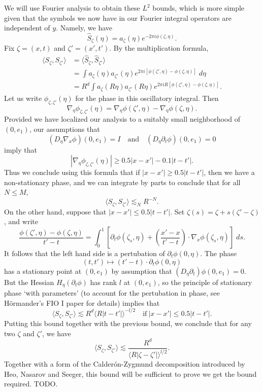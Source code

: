 We will use Fourier analysis to obtain these $L^2$ bounds, which is more simple given that the symbols we now have in our Fourier integral operators are independent of $y$. Namely, we have
%
\[ \widehat{S}_\zeta(\eta) = a_\zeta(\eta) e^{- 2 \pi i \phi(\zeta,\eta)}. \]
%
Fix $\zeta = (x,t)$ and $\zeta' = (x',t')$. By the multiplication formula,
%
\begin{align*}
    \langle S_\zeta, S_{\zeta'} \rangle &= \langle \widehat{S}_\zeta, \widehat{S}_{\zeta'} \rangle\\
    &= \int a_\zeta(\eta) a_{\zeta'}(\eta) e^{2 \pi i [ \phi(\zeta', \eta) - \phi(\zeta,\eta) ]}\; d\eta\\
    &= R^d \int a_\zeta( R \eta) a_{\zeta'}( R \eta ) e^{2 \pi i R [ \phi(\zeta', \eta) - \phi(\zeta, \eta) ] }.
\end{align*}
%
Let us write $\phi_{\zeta,\zeta'}(\eta)$ for the phase in this oscillatory integral. Then
%
\[ \nabla_\eta \phi_{\zeta,\zeta'}(\eta) = \nabla_\eta \phi(\zeta', \eta) - \nabla_\eta \phi(\zeta, \eta). \]
%
Provided we have localized our analysis to a suitably small neighborhood of $(0,e_1)$, our assumptions that
%
\[ (D_\eta \nabla_x \phi)(0, e_1) = I \quad\text{and}\quad (D_\eta \partial_t \phi)(0,e_1) = 0 \]
%
imply that
%
\[ |\nabla_\eta \phi_{\zeta,\zeta'}(\eta)| \geq 0.5 |x - x'| - 0.1 |t - t'|. \]
%
Thus we conclude using this formula that if $|x - x'| \geq 0.5 |t - t'|$, then we have a non-stationary phase, and we can integrate by parts to conclude that for all $N \leq M$,
%
\[ \langle S_\zeta, S_{\zeta'} \rangle \lesssim_N R^{-N}. \]
%
On the other hand, suppose that $|x - x'| \leq 0.5 |t - t'|$. Set $\zeta(s) = \zeta + s(\zeta' - \zeta)$, and write
%
\[ \frac{\phi(\zeta',\eta) - \phi(\zeta, \eta)}{t' - t} = \int_0^1 \left[ \partial_t \phi(\zeta_s, \eta) + \left( \frac{x' - x}{t' - t} \right) \cdot \nabla_x \phi(\zeta_s, \eta) \right]\; ds. \]
%
It follows that the left hand side is a pertubation of $\partial_t \phi(0, \eta)$. The phase
%
\[ (t,t') \mapsto (t' - t) \cdot \partial_t \phi(0,\eta) \]
%
has a stationary point at $(0,e_1)$ by assumption that $(D_\eta \partial_t) \phi(0,e_1) = 0$. But the Hessian $H_\eta(\partial_t \phi)$ has rank $l$ at $(0,e_1)$, so the principle of stationary phase `with parameters' (to account for the pertubation in phase, see H\"{o}rmander's FIO I paper for details) implies that
%
\[ \langle S_\zeta, S_{\zeta'} \rangle \lesssim R^d \langle R |t - t'| \rangle^{-l/2} \quad\text{if}\ |x - x'| \leq 0.5 |t - t'|. \]
%
Putting this bound together with the previous bound, we conclude that for any two $\zeta$ and $\zeta'$, we have
%
\[ \langle S_\zeta, S_{\zeta'} \rangle \lesssim \frac{R^d}{\langle R |\zeta - \zeta'| \rangle^{l/2}}. \]
%
Together with a form of the Calder\'{o}n-Zygmund decomposition introduced by Heo, Nasarov and Seeger, this bound will be sufficient to prove we get the bound required. TODO.











